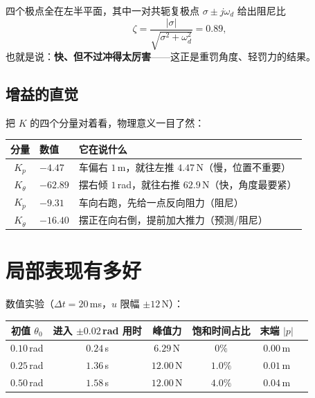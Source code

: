 四个极点全在左半平面，其中一对共轭复极点 $\sigma\pm j\omega_d$ 给出阻尼比
\begin{equation}
  \zeta = \frac{|\sigma|}{\sqrt{\sigma^2+\omega_d^2}} = 0.89 ,
\end{equation}
也就是说：\textbf{快、但不过冲得太厉害}——这正是重罚角度、轻罚力的结果。

\subsection{增益的直觉}

把 $K$ 的四个分量对着看，物理意义一目了然：

\begin{center}
\small
\begin{tabular}{@{}clp{8.2cm}@{}}
\toprule
分量 & 数值 & 它在说什么 \\
\midrule
$K_p$ & $-4.47$ & 车偏右 $1$\,m，就往左推 $4.47$\,N（慢，位置不重要）\\
$K_\theta$ & $-62.89$ & 摆右倾 $1$\,rad，就往右推 $62.9$\,N（快，角度最要紧）\\
$K_{\dot p}$ & $-9.31$ & 车向右跑，先给一点反向阻力（阻尼）\\
$K_{\dot\theta}$ & $-16.40$ & 摆正在向右倒，提前加大推力（预测/阻尼）\\
\bottomrule
\end{tabular}
\end{center}


\section{局部表现有多好}

数值实验（$\Delta t=20$\,ms，$u$ 限幅 $\pm12$\,N）：

\begin{center}
\small
\begin{tabular}{@{}cccccc@{}}
\toprule
初值 $\theta_0$ & 进入 $\pm0.02$\,rad 用时 & 峰值力 & 饱和时间占比 & 末端 $|p|$ \\
\midrule
$0.10$\,rad & $0.24$\,s & $6.29$\,N & $0\%$ & $0.00$\,m \\
$0.25$\,rad & $1.36$\,s & $12.00$\,N & $1.0\%$ & $0.01$\,m \\
$0.50$\,rad & $1.58$\,s & $12.00$\,N & $4.0\%$ & $0.04$\,m \\
\bottomrule
\end{tabular}
\end{center}

